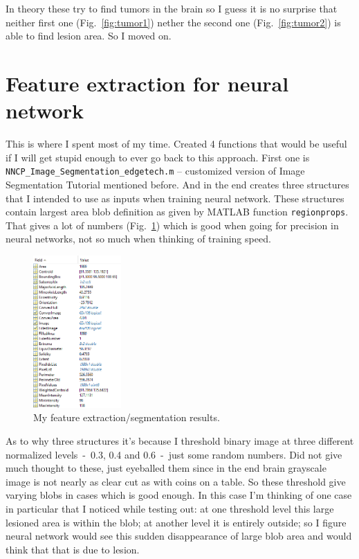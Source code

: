 \documentclass[12pt]{article}
\begin{document}
In theory these try to find tumors in the brain so I guess it is no surprise that neither first one (Fig.~\ref{fig:tumor1}) nether the second one (Fig.~\ref{fig:tumor2}) is able to find lesion area. So I moved on.

\section{Feature extraction for neural network}
\label{sec:featnn}

This is where I spent most of my time. Created 4 functions that would be useful if I will get stupid enough to ever go back to this approach. First one is \texttt{NNCP\_Image\_Segmentation\_edgetech.m} – customized version of Image Segmentation Tutorial mentioned before. And in the end creates three structures that I intended to use as inputs when training neural network. These structures contain largest area blob definition as given by MATLAB function \texttt{regionprops}. That gives a lot of numbers (Fig.~\ref{fig:matalbNumbers}) which is good when going for precision in neural networks, not so much when thinking of training speed. 

\begin{figure}[!htb]
\centering
\includegraphics[width=0.3\textwidth]{img/MATLAB_2017-12-17_15-38-27}
\caption{My feature extraction/segmentation results.}
\label{fig:matalbNumbers}
\end{figure}

As to why three structures it's because I threshold binary image at three different normalized levels~-~0.3, 0.4 and 0.6~-~just some random numbers. Did not give much thought to these, just eyeballed them since in the end brain grayscale image is not nearly as clear cut as with coins on a table. So these threshold give varying blobs in cases which is good enough. In this case I'm thinking of one case in particular that I noticed while testing out: at one threshold level this large lesioned area is within the blob; at another level it is entirely outside; so I figure neural network would see this sudden disappearance of large blob area and would think that that is due to lesion.
\end{document}
